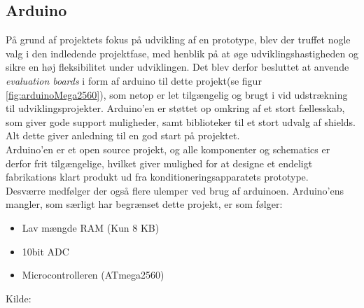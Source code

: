 \subsection{Arduino}
\begin{minipage}[t]{0.6\textwidth}
På grund af projektets fokus på udvikling af en prototype, blev der truffet nogle valg i den indledende projektfase, med henblik på at øge udviklingshastigheden og sikre en høj fleksibilitet under udviklingen. Det blev derfor besluttet at anvende \textit{evaluation boards} i form af arduino til dette projekt(se figur \ref{fig:arduinoMega2560}), som netop er let tilgængelig og brugt i vid udstrækning til udviklingsprojekter. Arduino'en er støttet op omkring af et stort fællesskab, som giver gode support muligheder, samt biblioteker til et stort udvalg af shields. Alt dette giver anledning til en god start på projektet.\\

Arduino'en er et open source projekt, og alle komponenter og schematics er derfor frit tilgængelige, hvilket giver mulighed for at designe et endeligt fabrikations klart produkt ud fra konditioneringsapparatets prototype.\\

Desværre medfølger der også flere ulemper ved brug af arduinoen. Arduino'ens mangler, som særligt har begrænset dette projekt, er som følger:\\

\begin{itemize}
	\item Lav mængde RAM (Kun 8 KB) 
	\item 10bit ADC
	\item Microcontrolleren (ATmega2560)
\end{itemize}
Kilde: \cite{RefWorks:40}

\end{minipage}
